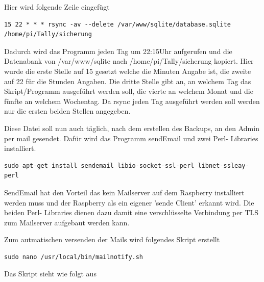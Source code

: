 \documentclass[11pt,a4paper]{article} %
\begin{document}
Hier wird folgende Zeile eingef\"ugt
\begin{frame}

\begin{lstlisting}
15 22 * * * rsync -av --delete /var/www/sqlite/database.sqlite  /home/pi/Tally/sicherung
\end{lstlisting}
\end{frame}
Dadurch wird das Programm jeden Tag um 22:15Uhr aufgerufen und die Datenabank von /var/www/sqlite nach /home/pi/Tally/sicherung  kopiert. Hier wurde die erste Stelle auf 15 gesetzt welche die Minuten Angabe ist, die zweite auf 22 für die Stunden Angaben. Die dritte Stelle gibt an, an welchem Tag das Skript/Programm ausgeführt werden soll, die vierte an welchem Monat und die fünfte an welchem Wochentag. Da rsync jeden Tag ausgeführt werden soll werden nur die ersten beiden Stellen angegeben.
\par
Diese Datei soll nun auch täglich, nach dem erstellen des Backups, an den Admin per mail gesendet.
Dafür wird das Programm sendEmail und zwei Perl- Libraries installiert.
\begin{frame}

\begin{lstlisting}
sudo apt-get install sendemail libio-socket-ssl-perl libnet-ssleay-perl
\end{lstlisting}
\end{frame}
SendEmail hat den Vorteil das kein Mailserver auf dem Raspberry installiert werden muss und der Raspberry als ein eigener 'sende Client' erkannt wird. Die beiden Perl- Libraries dienen dazu damit eine verschlüsselte Verbindung per TLS zum Mailserver aufgebaut werden kann.
\par
Zum autmatischen versenden der Mails wird folgendes Skript erstellt \cite{8}
\begin{frame}

\begin{lstlisting}
sudo nano /usr/local/bin/mailnotify.sh
\end{lstlisting}
\end{frame}
\newpage
Das Skript sieht wie folgt aus
\end{document}
